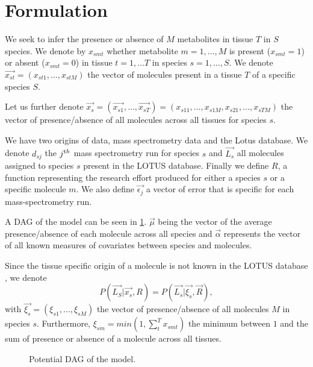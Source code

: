 \documentclass[a4paper,10pt]{article}
\begin{document}
\section{Formulation}
We seek to infer the presence or absence of $M$ metabolites in tissue $T$ in $S$ species. We denote by $x_{smt}$ whether metabolite $m=1,\ldots,M$ is present ($x_{smt}=1$) or absent ($x_{smt}=0$) in tissue $t = 1, \ldots T$ in species $s=1,\ldots,S$. We denote $\vec{x_{st}} = (x_{st1}, \ldots, x_{stM})$ the vector of molecules present in a tissue $T$ of a specific species $S$. 

Let us further denote $\vec{x_s} = (\vec{x_{s1}}, \ldots , \vec{x_{sT}}) = (x_{s11}, \ldots, x_{s1M}, x_{s21}, \ldots, x_{sTM})$ the vector of presence/absence of all molecules across all tissues for species $s$. 

We have two origins of data, mass spectrometry data and the Lotus database. We denote $d_{sj}$ the $j^{ \text th}$ mass spectrometry run for species $s$ and $\vec{L_s}$ all molecules assigned to species $s$ present in the LOTUS database. Finally we define $R$, a function representing the research effort produced for either a species $s$ or a specific molecule $m$. We also define $\vec{\epsilon_j}$ a vector of error that is specific for each mass-spectrometry run. 

A DAG of the model can be seen in \cref{fig:DAG_model}. $\vec{\mu}$ being the vector of the average presence/absence of each molecule across all species and $\vec{\alpha}$ represents the vector of all known measures of covariates between species and molecules. 

Since the tissue specific origin of a molecule is not known in the LOTUS database \cite{rutzLOTUSInitiativeOpen2022}, we denote $$P(\vec{L_S} | \vec{x_s}, R) = P(\vec{L_s} | \vec{\xi_s}, \vec{R}), $$ with $\vec{\xi_s} = (\xi_{s1}, \ldots, \xi_{sM} )$ the vector of presence/absence of all molecules $M$ in species $s$. Furthermore, $\xi_{sm} = min(1, \sum_{t}^{T} x_{smt})$ the minimum between $1$ and the sum of presence or absence of a molecule across all tissues. 

\begin{figure}
\caption{Potential DAG of the model.}
\label{fig:DAG_model}
\end{figure}
\end{document}
